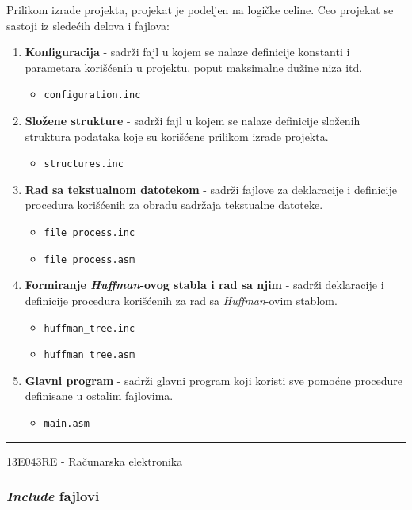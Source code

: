 \documentclass[a4paper, 12pt]{article}
\newcommand{\btmline}{
\vfill
\rule{0.9\textwidth}{0.4mm}
\begin{center}
13E043RE - Računarska elektronika
\end{center}}
\begin{document}
Prilikom izrade projekta, projekat je podeljen na logičke celine. Ceo projekat se sastoji iz sledećih delova i fajlova:

\begin{enumerate}
\item \textbf{Konfiguracija} - sadrži fajl u kojem se nalaze definicije konstanti i parametara korišćenih u projektu, poput maksimalne dužine niza itd.
	\begin{itemize}
	\item \verb|configuration.inc|
	\end{itemize}
	\item \textbf{Složene strukture} - sadrži fajl u kojem se nalaze definicije složenih struktura podataka koje su korišćene prilikom izrade projekta.
	\begin{itemize}
	\item \verb|structures.inc|
	\end{itemize}
\item \textbf{Rad sa tekstualnom datotekom} - sadrži fajlove za deklaracije i definicije procedura korišćenih za obradu sadržaja tekstualne datoteke.
	\begin{itemize}
	\item \verb|file_process.inc|
	\item \verb|file_process.asm|
	\end{itemize}
\item \textbf{Formiranje \textit{Huffman}-ovog stabla i rad sa njim} - sadrži deklaracije i definicije procedura korišćenih za rad sa \textit{Huffman}-ovim stablom.
	\begin{itemize}
	\item \verb|huffman_tree.inc|
	\item \verb|huffman_tree.asm|
	\end{itemize}
\item \textbf{Glavni program} - sadrži glavni program koji koristi sve pomoćne procedure definisane u ostalim fajlovima.
	\begin{itemize}
	\item \verb|main.asm|
	\end{itemize}
\end{enumerate}

\btmline\newpage

\subsubsection*{\textit{Include} fajlovi}
\end{document}
